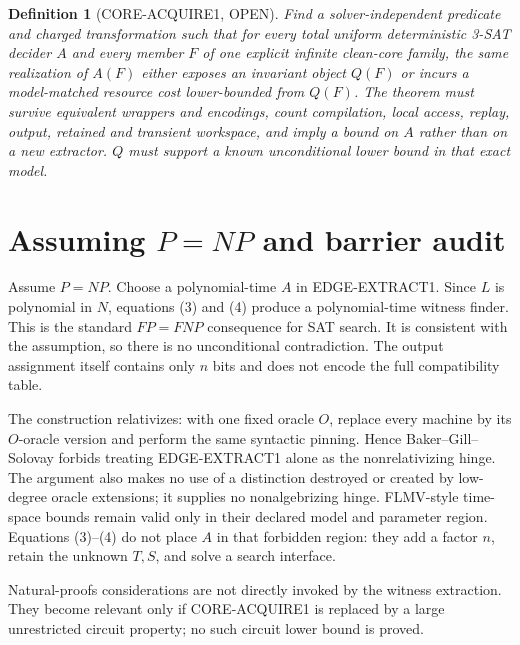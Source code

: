 \documentclass[11pt]{article}
\newtheorem{definition}{Definition}
\begin{document}
\begin{definition}[CORE-ACQUIRE1, OPEN]
Find a solver-independent predicate and charged transformation such that
for every total uniform deterministic 3-SAT decider $A$ and every member
$F$ of one explicit infinite clean-core family, the \emph{same realization}
of $A(F)$ either exposes an invariant object $Q(F)$ or incurs a
model-matched resource cost lower-bounded from $Q(F)$.  The theorem must
survive equivalent wrappers and encodings, count compilation, local access,
replay, output, retained and transient workspace, and imply a bound on $A$
rather than on a new extractor.  $Q$ must support a known unconditional
lower bound in that exact model.
\end{definition}

\section{Assuming $P=NP$ and barrier audit}
Assume $P=NP$.  Choose a polynomial-time $A$ in EDGE-EXTRACT1.  Since
$L$ is polynomial in $N$, equations (3) and (4) produce a polynomial-time
witness finder.  This is the standard $FP=FNP$ consequence for SAT search.
It is consistent with the assumption, so there is no unconditional
contradiction.  The output assignment itself contains only $n$ bits and
does not encode the full compatibility table.

The construction relativizes: with one fixed oracle $O$, replace every
machine by its $O$-oracle version and perform the same syntactic pinning.
Hence Baker--Gill--Solovay forbids treating EDGE-EXTRACT1 alone as the
nonrelativizing hinge.  The argument also makes no use of a distinction
destroyed or created by low-degree oracle extensions; it supplies no
nonalgebrizing hinge.  FLMV-style time-space bounds remain valid only in
their declared model and parameter region.  Equations (3)--(4) do not place
$A$ in that forbidden region: they add a factor $n$, retain the unknown
$T,S$, and solve a search interface.

Natural-proofs considerations are not directly invoked by the witness
extraction.  They become relevant only if CORE-ACQUIRE1 is replaced by a
large unrestricted circuit property; no such circuit lower bound is proved.
\end{document}
